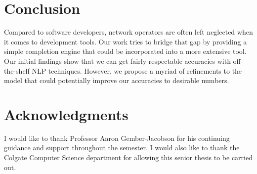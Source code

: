 \section{Conclusion}
Compared to software developers, network operators are often left neglected when it comes to development tools. Our work tries to bridge that gap by providing a simple completion engine that could be incorporated into a more extensive tool. Our initial findings show that we can get fairly respectable accuracies with off-the-shelf NLP techniques. However, we propose a myriad of refinements to the model that could potentially improve our accuracies to desirable numbers.

\section{Acknowledgments}
I would like to thank Professor Aaron Gember-Jacobson for his continuing guidance and support throughout the semester. I would also like to thank the Colgate Computer Science department for allowing this senior thesis to be carried out.